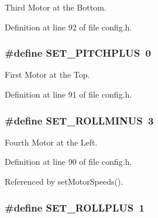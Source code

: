 Third Motor at the Bottom. 



Definition at line 92 of file config.\-h.

\hypertarget{group__config_gaf0a00d922db66d875ca53f6db34e7307}{
\subsubsection[{S\-E\-T\-\_\-\-P\-I\-T\-C\-H\-P\-L\-U\-S}]{\setlength{\rightskip}{0pt plus 5cm}\#define S\-E\-T\-\_\-\-P\-I\-T\-C\-H\-P\-L\-U\-S~0}}\label{group__config_gaf0a00d922db66d875ca53f6db34e7307}


First Motor at the Top. 



Definition at line 91 of file config.\-h.

\hypertarget{group__config_ga9921670161925a1d7b946aeb65d5767a}{
\subsubsection[{S\-E\-T\-\_\-\-R\-O\-L\-L\-M\-I\-N\-U\-S}]{\setlength{\rightskip}{0pt plus 5cm}\#define S\-E\-T\-\_\-\-R\-O\-L\-L\-M\-I\-N\-U\-S~3}}\label{group__config_ga9921670161925a1d7b946aeb65d5767a}


Fourth Motor at the Left. 



Definition at line 90 of file config.\-h.



Referenced by set\-Motor\-Speeds().

\hypertarget{group__config_ga460dbe0039d252579c5ce8beef7cc709}{
\subsubsection[{S\-E\-T\-\_\-\-R\-O\-L\-L\-P\-L\-U\-S}]{\setlength{\rightskip}{0pt plus 5cm}\#define S\-E\-T\-\_\-\-R\-O\-L\-L\-P\-L\-U\-S~1}}\label{group__config_ga460dbe0039d252579c5ce8beef7cc709}


